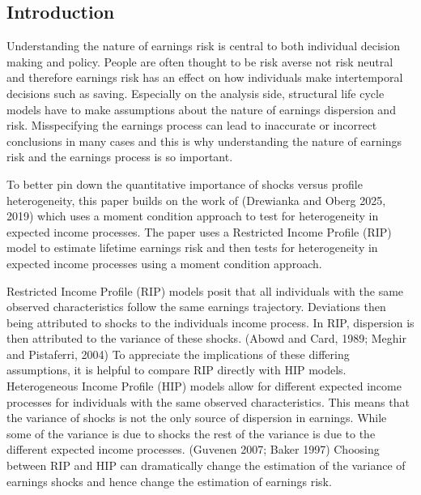 \documentclass[12pt]{article}
\begin{document}











\begin{onehalfspace}

\section{Introduction}


Understanding the nature of earnings risk is central to both individual decision making and policy. People are often thought to be risk averse not risk neutral and therefore earnings risk has an effect on how individuals make intertemporal decisions such as saving. Especially on the analysis side, structural life cycle models have to make assumptions about the nature of earnings dispersion and risk. Misspecifying the earnings process can lead to inaccurate or incorrect conclusions in many cases and this is why understanding the nature of earnings risk and the earnings process is so important.

To better pin down the quantitative importance of shocks versus profile heterogeneity, this paper builds on the work of (Drewianka and Oberg 2025, 2019) \cite{drewianka2025,drewianka_oberg2019} which uses a moment condition approach to test for heterogeneity in expected income processes. The paper uses a Restricted Income Profile (RIP) model to estimate lifetime earnings risk and then tests for heterogeneity in expected income processes using a moment condition approach. 

Restricted Income Profile (RIP) models posit that all individuals with the same observed characteristics follow the same earnings trajectory. Deviations then being attributed to shocks to the individuals income process. In RIP, dispersion is then attributed to the variance of these shocks. (Abowd and Card, 1989; Meghir and Pistaferri, 2004) \cite{abowd_card1989,meghir_pistaferri2004} To appreciate the implications of these differing assumptions, it is helpful to compare RIP directly with HIP models. Heterogeneous Income Profile (HIP) models allow for different expected income processes for individuals with the same observed characteristics. This means that the variance of shocks is not the only source of dispersion in earnings. While some of the variance is due to shocks the rest of the variance is due to the different expected income processes. (Guvenen 2007; Baker 1997) \cite{guvenen2009,baker1997}Choosing between RIP and HIP can dramatically change the estimation of the variance of earnings shocks and hence change the estimation of earnings risk. 


\end{onehalfspace}
\end{document}
